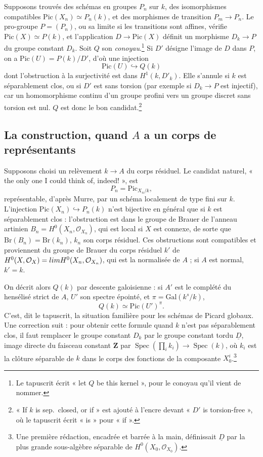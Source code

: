 \documentclass[11pt,a4paper]{article}
\begin{document}
Supposons trouvés des schémas en groupes $P_n$ sur $k$, des isomorphismes
compatibles $\mathrm{Pic}(X_n) \simeq P_n(k)$, et des morphismes de transition
$P_m \to P_n$. Le pro-groupe $P = (P_n)$, ou sa limite si les transitions sont
affines, vérifie $\mathrm{Pic}(X) \simeq P(k)$, et l'application
$D \to \mathrm{Pic}(X)$ définit un morphisme $D_k \to P$ du groupe constant
$D_k$. Soit $Q$ son \emph{conoyau}.\footnote{Le tapuscrit écrit « let $Q$ be
this kernel », pour le conoyau qu'il vient de nommer.} Si $D'$ désigne l'image
de $D$ dans $P$, on a $\mathrm{Pic}(U) = P(k)/D'$, d'où une injection
\[
\mathrm{Pic}(U) \hookrightarrow Q(k)
\]
dont l'obstruction à la surjectivité est dans $H^1(k, D'_k)$. Elle s'annule si
$k$ est séparablement clos, ou si $D'$ est sans torsion (par exemple si
$D_k \to P$ est injectif), car un homomorphisme continu d'un groupe profini
vers un groupe discret sans torsion est nul. $Q$ est donc le bon
candidat.\footnote{« If $k$ is sep.\ closed, or if » est ajouté à l'encre
devant « $D'$ is torsion-free », où le tapuscrit écrit « is » pour « if ».}

\subsection*{La construction, quand $A$ a un corps de représentants}

Supposons choisi un relèvement $k \to A$ du corps résiduel. Le candidat
naturel, « the only one I could think of, indeed! », est
\[
P_n = \mathrm{Pic}_{X_n/k} ,
\]
représentable, d'après Murre, par un schéma localement de type fini sur $k$.
L'injection $\mathrm{Pic}(X_n) \hookrightarrow P_n(k)$ n'est bijective en
général que si $k$ est séparablement clos : l'obstruction est dans le groupe de
Brauer de l'anneau artinien $B_n = H^0(X_n, \mathcal{O}_{X_n})$, qui est local
si $X$ est connexe, de sorte que $\mathrm{Br}(B_n) = \mathrm{Br}(k_n)$, $k_n$
son corps résiduel. Ces obstructions sont compatibles et proviennent du groupe
de Brauer du corps résiduel $k'$ de
$H^0(X, \mathcal{O}_X) = \varprojlim H^0(X_n, \mathcal{O}_{X_n})$, qui est la
normalisée de $A$ ; si $A$ est normal, $k' = k$.

On décrit alors $Q(k)$ par descente galoisienne : si $A'$ est le complété du
hensélisé strict de $A$, $U'$ son spectre épointé, et $\pi = \mathrm{Gal}(k^s/k)$,
\[
Q(k) \simeq \mathrm{Pic}(U')^{\pi} .
\]
C'est, dit le tapuscrit, la situation familière pour les schémas de Picard
globaux. Une correction suit : pour obtenir cette formule quand $k$ n'est pas
séparablement clos, il faut remplacer le groupe constant $D_k$ par le groupe
constant tordu $\underline{D}$, image directe du faisceau constant $\mathbf{Z}$
par $\operatorname{Spec}(\prod_i k_i) \to \operatorname{Spec}(k)$, où $k_i$ est
la clôture séparable de $k$ dans le corps des fonctions de la composante
$X_0^i$.\footnote{Une première rédaction, encadrée et barrée à la main,
définissait $\underline{D}$ par la plus grande sous-algèbre séparable de
$H^0(X_0, \mathcal{O}_{X_0})$.}
\end{document}
